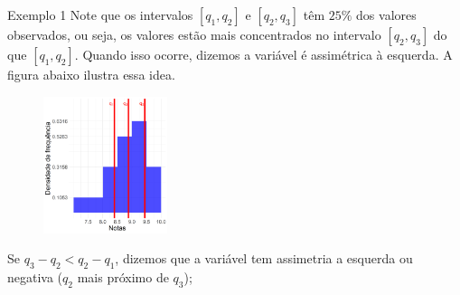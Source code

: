 \documentclass[8pt]{beamer}
\begin{document}
\begin{frame}{Exemplo 1}
	Note que os intervalos $[q_1,q_2]$ e $[q_2,q_3]$  têm $25\%$ dos valores observados, ou seja, os valores estão mais concentrados no intervalo $[q_2, q_3]$ do que $[q_1, q_2]$. 
	Quando isso ocorre, dizemos a variável é assimétrica à esquerda. A figura abaixo ilustra essa idea.
	\begin{figure}[htbp]
		\centering
		\includegraphics[height=4cm]{asim_histogram_turma_1.png}
	\end{figure}
	Se $q_3-q_2 < q_2 - q_1$, dizemos que a variável tem assimetria a esquerda ou negativa ($q_2$ mais próximo de $q_3$);
\end{frame}
\end{document}
